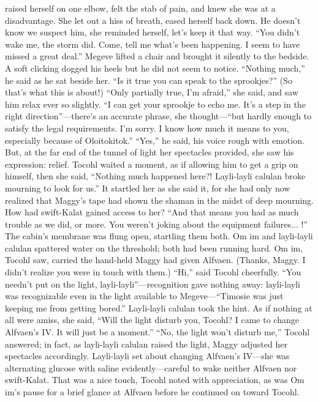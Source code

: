 \documentclass[9pt]{article}
\begin{document}
raised herself on one elbow, felt the stab of pain, and knew she was at a disadvantage. She let out a hiss
of breath, eased herself back down. He doesn’t know we suspect him, she reminded herself, let’s keep it
that way. “You didn’t wake me, the storm did. Come, tell me what’s been happening. I seem to have
missed a great deal.”
Megeve lifted a chair and brought it silently to the bedside. A soft clicking dogged his heels but he did
not seem to notice. “Nothing much,” he said as he sat beside her. “Is it true you can speak to the
sprookjes?”
(So that’s what this is about!) “Only partially true, I’m afraid,” she said, and saw him relax ever so
slightly. “I can get your sprookje to echo me. It’s a step in the right direction”—there’s an accurate
phrase, she thought—“but hardly enough to satisfy the legal requirements. I’m sorry. I know how much it
means to you, especially because of Oloitokitok.”
“Yes,” he said, his voice rough with emotion. But, at the far end of the tunnel of light her spectacles
provided, she saw his expression: relief.
Tocohl waited a moment, as if allowing him to get a grip on himself, then she said, “Nothing much
happened here?! Layli-layli calulan broke mourning to look for us.” It startled her as she said it, for she
had only now realized that Maggy’s tape had shown the shaman in the midst of deep mourning. How had
swift-Kalat gained access to her? “And that means you had as much trouble as we did, or more. You
weren’t joking about the equipment failures... !”
The cabin’s membrane was flung open, startling them both. Om im and layli-layli calulan spattered
water on the threshold; both had been running hard. Om im, Tocohl saw, carried the hand-held Maggy
had given Alfvaen. (Thanks, Maggy. I didn’t realize you were in touch with them.)
“Hi,” said Tocohl cheerfully. “You needn’t put on the light, layli-layli”—recognition gave nothing
away: layli-layli was recognizable even in the light available to Megeve—“Timosie was just keeping me
from getting bored.”
Layli-layli calulan took the hint. As if nothing at all were amiss, she said, “Will the light disturb you,
Tocohl? I came to change Alfvaen’s IV. It will just be a moment.”
“No, the light won’t disturb me,” Tocohl answered; in fact, as layli-layli calulan raised the light,
Maggy adjusted her spectacles accordingly.
Layli-layli set about changing Alfvaen’s IV—she was alternating glucose with saline
evidently—careful to wake neither Alfvaen nor swift-Kalat. That was a nice touch, Tocohl noted with
appreciation, as was Om im’s pause for a brief glance at Alfvaen before he continued on toward Tocohl.
\end{document}
